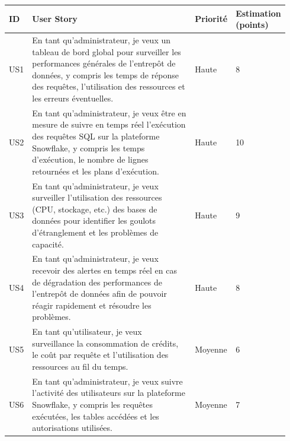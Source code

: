 \begin{center}

    \begin{longtable}{|p{0.05\linewidth}|p{0.65\linewidth}|p{0.12\linewidth}|p{0.12\linewidth}|}
        \hline       
        \rowcolor{blue!18}\textbf{ID} & \textbf{User Story} &  \textbf{Priorité} & \textbf{Estimation (points)} \\
        \hline
        \endfirsthead
        US1 &  En tant qu'administrateur, je veux un tableau de bord global pour surveiller les performances générales de l'entrepôt de données, y compris les temps de réponse des requêtes, l'utilisation des ressources et les erreurs éventuelles. & Haute & 8 \\
        
        \hline
        
        US2 &  En tant qu'administrateur, je veux être en mesure de suivre en temps réel l'exécution des requêtes SQL sur la plateforme Snowflake, y compris les temps d'exécution, le nombre de lignes retournées et les plans d'exécution. & Haute & 10 \\
        
        \hline
        
        US3 &  En tant qu'administrateur, je veux surveiller l'utilisation des ressources (CPU, stockage, etc.) des bases de données pour identifier les goulots d'étranglement et les problèmes de capacité. & Haute & 9 \\
        
        \hline
        
        US4 &  En tant qu'administrateur, je veux recevoir des alertes en temps réel en cas de dégradation des performances de l'entrepôt de données afin de pouvoir réagir rapidement et résoudre les problèmes. & Haute & 8 \\
        
        \hline
        
        US5 & En tant qu'utilisateur, je veux surveillance la consommation de crédits, le coût par requête et l'utilisation des ressources au fil du temps. & Moyenne & 6 \\
        
        \hline
        
        US6 &  En tant qu'administrateur, je veux suivre l'activité des utilisateurs sur la plateforme Snowflake, y compris les requêtes exécutées, les tables accédées et les autorisations utilisées. & Moyenne & 7 \\
        

\end{longtable}
\end{center}
